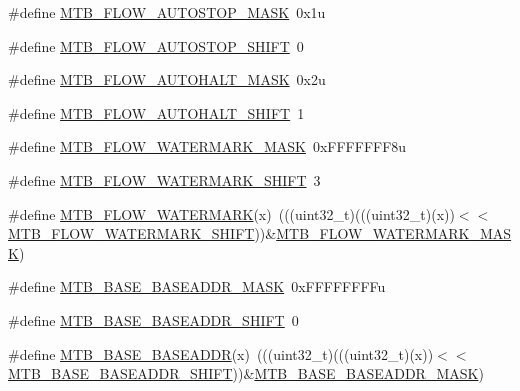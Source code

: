 \begin{DoxyCompactItemize}
\item 
\#define \hyperlink{group___m_t_b___register___masks_ga9a44f1be981682cb9519f33e95b94644}{M\+T\+B\+\_\+\+F\+L\+O\+W\+\_\+\+A\+U\+T\+O\+S\+T\+O\+P\+\_\+\+M\+A\+SK}~0x1u
\item 
\#define \hyperlink{group___m_t_b___register___masks_gacd0f126527ae40477d013b771e5103ee}{M\+T\+B\+\_\+\+F\+L\+O\+W\+\_\+\+A\+U\+T\+O\+S\+T\+O\+P\+\_\+\+S\+H\+I\+FT}~0
\item 
\#define \hyperlink{group___m_t_b___register___masks_ga6be5a7f0961e0862f4d2d270f0524a51}{M\+T\+B\+\_\+\+F\+L\+O\+W\+\_\+\+A\+U\+T\+O\+H\+A\+L\+T\+\_\+\+M\+A\+SK}~0x2u
\item 
\#define \hyperlink{group___m_t_b___register___masks_ga6791ae220dbaca3c5866b664c56c0b56}{M\+T\+B\+\_\+\+F\+L\+O\+W\+\_\+\+A\+U\+T\+O\+H\+A\+L\+T\+\_\+\+S\+H\+I\+FT}~1
\item 
\#define \hyperlink{group___m_t_b___register___masks_ga381f94c6e6980a65bb9fbc594dd688bd}{M\+T\+B\+\_\+\+F\+L\+O\+W\+\_\+\+W\+A\+T\+E\+R\+M\+A\+R\+K\+\_\+\+M\+A\+SK}~0x\+F\+F\+F\+F\+F\+F\+F8u
\item 
\#define \hyperlink{group___m_t_b___register___masks_ga0307292719da2a56557ce153eada2315}{M\+T\+B\+\_\+\+F\+L\+O\+W\+\_\+\+W\+A\+T\+E\+R\+M\+A\+R\+K\+\_\+\+S\+H\+I\+FT}~3
\item 
\#define \hyperlink{group___m_t_b___register___masks_gab88d4a36c552161249e11b5f0a1843cf}{M\+T\+B\+\_\+\+F\+L\+O\+W\+\_\+\+W\+A\+T\+E\+R\+M\+A\+RK}(x)~(((uint32\+\_\+t)(((uint32\+\_\+t)(x))$<$$<$\hyperlink{group___m_t_b___register___masks_ga0307292719da2a56557ce153eada2315}{M\+T\+B\+\_\+\+F\+L\+O\+W\+\_\+\+W\+A\+T\+E\+R\+M\+A\+R\+K\+\_\+\+S\+H\+I\+FT}))\&\hyperlink{group___m_t_b___register___masks_ga381f94c6e6980a65bb9fbc594dd688bd}{M\+T\+B\+\_\+\+F\+L\+O\+W\+\_\+\+W\+A\+T\+E\+R\+M\+A\+R\+K\+\_\+\+M\+A\+SK})
\item 
\#define \hyperlink{group___m_t_b___register___masks_ga9aabef14f0b7a38e25f049f289273193}{M\+T\+B\+\_\+\+B\+A\+S\+E\+\_\+\+B\+A\+S\+E\+A\+D\+D\+R\+\_\+\+M\+A\+SK}~0x\+F\+F\+F\+F\+F\+F\+F\+Fu
\item 
\#define \hyperlink{group___m_t_b___register___masks_gaaa4c5bd3736221b3c88252a206a4b716}{M\+T\+B\+\_\+\+B\+A\+S\+E\+\_\+\+B\+A\+S\+E\+A\+D\+D\+R\+\_\+\+S\+H\+I\+FT}~0
\item 
\#define \hyperlink{group___m_t_b___register___masks_gade2bba1592e9c02f0696a12e98e48736}{M\+T\+B\+\_\+\+B\+A\+S\+E\+\_\+\+B\+A\+S\+E\+A\+D\+DR}(x)~(((uint32\+\_\+t)(((uint32\+\_\+t)(x))$<$$<$\hyperlink{group___m_t_b___register___masks_gaaa4c5bd3736221b3c88252a206a4b716}{M\+T\+B\+\_\+\+B\+A\+S\+E\+\_\+\+B\+A\+S\+E\+A\+D\+D\+R\+\_\+\+S\+H\+I\+FT}))\&\hyperlink{group___m_t_b___register___masks_ga9aabef14f0b7a38e25f049f289273193}{M\+T\+B\+\_\+\+B\+A\+S\+E\+\_\+\+B\+A\+S\+E\+A\+D\+D\+R\+\_\+\+M\+A\+SK})

\end{DoxyCompactItemize}

